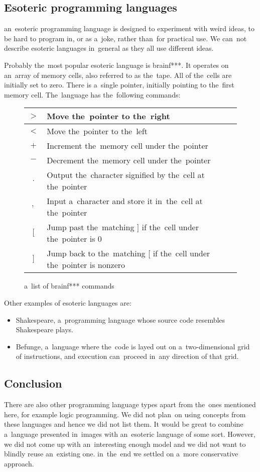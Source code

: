 \subsection{Esoteric programming languages}
an~esoteric programming language is designed to experiment with weird ideas, to be hard to program in, or as a~joke, rather than~for practical use. We can~not
describe esoteric languages in~general as they all use different ideas.

Probably the~most popular esoteric language is brainf***. It operates on an~array of memory cells, also referred to as the~tape. All of the~cells are initially
set to zero. There is a~single pointer, initially pointing to the~first memory cell. The~language has the~following commands:

\begin{figure}[!hbt]
    \centering
    \begin{tabular}{|c l |} 
    \hline
    $>$ & Move the~pointer to the~right \\
    \hline
    $<$ & Move the~pointer to the~left \\
    \hline
    $+$ & Increment the~memory cell under the~pointer \\
    \hline
    $-$ & Decrement the~memory cell under the~pointer \\
    \hline
    $.$ & Output the~character signified by the~cell at the~pointer \\
    \hline
    $,$ & Input a~character and store it in~the~cell at the~pointer \\
    \hline
    $[$ & Jump past the~matching ] if the~cell under the~pointer is 0 \\
    \hline
    $]$ & Jump back to the~matching [ if the~cell under the~pointer is nonzero \\
    \hline
    \end{tabular}
    \caption{a~list of brainf*** commands}
\end{figure}

Other examples of esoteric languages are:
\begin{itemize}
    \item Shakespeare, a~programming language whose source code resembles Shakespeare plays. 
    \item Befunge, a~language where the~code is layed out on a~two-dimensional grid of instructions, and execution can~proceed in~any direction of that grid.
\end{itemize}

\subsection{Conclusion}
There are also other programming language types apart from the~ones mentioned here, for example logic programming. We did not plan~on using
concepts from these languages and hence we did not list them. It would be great to combine a~language presented in~images with an~esoteric language
of some sort. However, we did not come up with an~interesting enough model and we did not want to blindly reuse an~existing one. in~the~end we settled on
a~more conservative approach.

